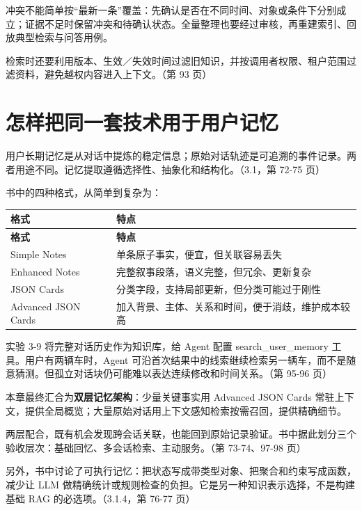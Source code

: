 \documentclass[UTF8,a4paper,11pt]{ctexart}
\newlength{\tableusable}
\newcommand{\code}[1]{{\small\ttfamily #1}}
\begin{document}
冲突不能简单按“最新一条”覆盖：先确认是否在不同时间、对象或条件下分别成立；证据不足时保留冲突和待确认状态。全量整理也要经过审核，再重建索引、回放典型检索与问答用例。

检索时还要利用版本、生效／失效时间过滤旧知识，并按调用者权限、租户范围过滤资料，避免越权内容进入上下文。（第 93 页）

\section{怎样把同一套技术用于用户记忆}

用户长期记忆是从对话中提炼的稳定信息；原始对话轨迹是可追溯的事件记录。两者用途不同。记忆提取遵循选择性、抽象化和结构化。（3.1，第 72-75 页）

书中的四种格式，从简单到复杂为：

\begingroup\small
\setlength{\tableusable}{\dimexpr\linewidth-2\tabcolsep\relax}
\begin{longtable}{@{}>{\raggedright\arraybackslash}p{0.3\tableusable}>{\raggedright\arraybackslash}p{0.7\tableusable}@{}}
\toprule
\textbf{格式} & \textbf{特点} \\
\midrule\endfirsthead
\toprule
\textbf{格式} & \textbf{特点} \\
\midrule\endhead
\bottomrule\endfoot
Simple Notes & 单条原子事实，便宜，但关联容易丢失 \\
Enhanced Notes & 完整叙事段落，语义完整，但冗余、更新复杂 \\
JSON Cards & 分类字段，支持局部更新，但分类可能过于刚性 \\
Advanced JSON Cards & 加入背景、主体、关系和时间，便于消歧，维护成本较高 \\
\end{longtable}\endgroup

实验 3-9 将完整对话历史作为知识库，给 Agent 配置 \code{search\_\allowbreak user\_\allowbreak memory} 工具。用户有两辆车时，Agent 可沿首次结果中的线索继续检索另一辆车，而不是随意猜测。但孤立对话块仍可能难以表达连续修改和时间关系。（第 95-96 页）

本章最终汇合为\textbf{双层记忆架构}：少量关键事实用 Advanced JSON Cards 常驻上下文，提供全局概览；大量原始对话用上下文感知检索按需召回，提供精确细节。

两层配合，既有机会发现跨会话关联，也能回到原始记录验证。书中据此划分三个验收层次：基础回忆、多会话检索、主动服务。（第 73-74、97-98 页）

另外，书中讨论了可执行记忆：把状态写成带类型对象、把聚合和约束写成函数，减少让 LLM 做精确统计或规则检查的负担。它是另一种知识表示选择，不是构建基础 RAG 的必选项。（3.1.4，第 76-77 页）
\end{document}
